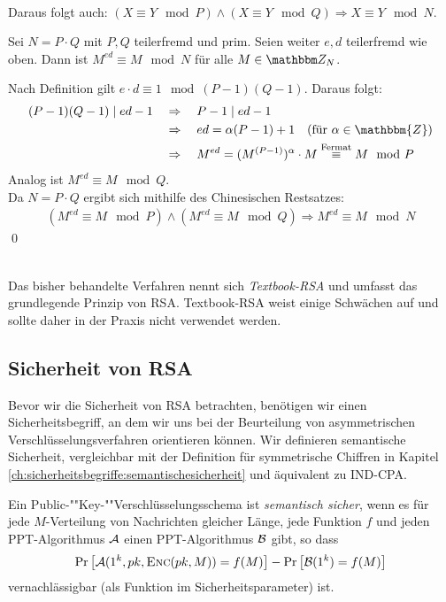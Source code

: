 ~\\
Daraus folgt auch: $(X \equiv Y \mod P) \land (X \equiv Y \mod Q) \Rightarrow X \equiv Y \mod N$.

\vspace{10pt}
\begin{theorem}
Sei $N = P \cdot Q$ mit $P, Q$ teilerfremd und prim. Seien weiter $e, d$ teilerfremd wie oben. Dann ist $M^{ed} \equiv M \mod N$ für alle $M \in \Z N$.
\end{theorem}
\vspace{10pt}

\begin{beweis}
Nach Definition gilt $e \cdot d \equiv 1 \mod (P-1)(Q-1)$. Daraus folgt:
\begin{align*}
(P-1)(Q-1) \mid ed - 1 \quad
& \Rightarrow \quad P-1 \mid ed - 1\\
& \Rightarrow \quad ed = \alpha (P-1) + 1 \quad (\text{für } \alpha \in \mathbbm{Z})\\
& \Rightarrow \quad M^{ed} = (M^{(P-1)})^{\alpha} \cdot M \stackrel{\text{Fermat}}\equiv M \mod P
\end{align*}
Analog ist $M^{ed} \equiv M \mod Q$.\\
Da $N = P \cdot Q$ ergibt sich mithilfe des Chinesischen Restsatzes:
\begin{align*}
(M^{ed} \equiv M \mod P) \land (M^{ed} \equiv M \mod Q) \Rightarrow M^{ed} \equiv M \mod N
\end{align*}
\qed
\end{beweis}

~\\
Das bisher behandelte Verfahren nennt sich \textit{Textbook-RSA} und umfasst das grundlegende Prinzip von RSA. Textbook-RSA weist einige Schwächen auf und
sollte daher in der Praxis nicht verwendet werden.


\subsection{Sicherheit von RSA}
\label{ch:asymmenc:rsa:sicherheit}
Bevor wir die Sicherheit von RSA betrachten, benötigen wir einen Sicherheitsbegriff, an dem wir uns bei der Beurteilung von asymmetrischen
Verschlüsselungsverfahren orientieren können. Wir definieren semantische Sicherheit, vergleichbar mit der Definition für symmetrische Chiffren in Kapitel
\ref{ch:sicherheitsbegriffe:semantischesicherheit} und äquivalent zu IND-CPA.

\vspace{10pt}
\begin{definition}
Ein Pub\-lic-""Key-""Ver\-schlüs\-sel\-ungs\-sche\-ma ist \textit{semantisch sicher}, wenn es für jede $M$-Verteilung von Nachrichten gleicher Länge, jede
Funktion $f$ und jeden PPT-Algorithmus $\mathcal{A}$ einen PPT-Algorithmus $\mathcal{B}$ gibt, so dass
\begin{equation*}
\Pr\left[\mathcal{A}(1^k, pk, \textsc{Enc}(pk, M)) = f(M)\right] - \Pr\left[\mathcal{B}(1^k) = f(M)\right]
\end{equation*}
vernachlässigbar (als Funktion im Sicherheitsparameter) ist.
\end{definition} 

